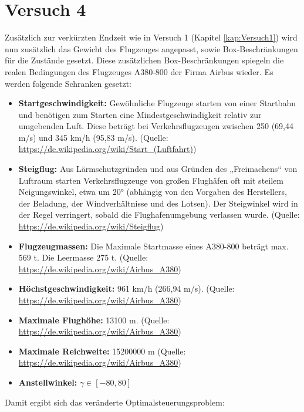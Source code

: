 \newpage
\section{Versuch 4}
Zusätzlich zur verkürzten Endzeit wie in Versuch 1 (Kapitel \ref{kap:Versuch1}) wird nun zusätzlich das Gewicht des Flugzeuges angepasst, sowie Box-Beschränkungen für die Zustände gesetzt. Diese zusätzlichen Box-Beschränkungen spiegeln die realen Bedingungen des Flugzeuges A380-800 der Firma Airbus wieder. Es werden folgende Schranken gesetzt:
\begin{itemize}
\item \textbf{Startgeschwindigkeit:} Gewöhnliche Flugzeuge starten von einer Startbahn und benötigen zum Starten eine Mindestgeschwindigkeit relativ zur umgebenden Luft. Diese beträgt bei Verkehrsflugzeugen zwischen 250 (69,44 m/s) und 345 km/h (95,83 m/s). (Quelle: \url{https://de.wikipedia.org/wiki/Start_(Luftfahrt)})
%
\item \textbf{Steigflug:} Aus Lärmschutzgründen und aus Gründen des „Freimachens“ von Luftraum starten Verkehrsflugzeuge von großen Flughäfen oft mit steilem Neigungswinkel, etwa um 20° (abhängig von den Vorgaben des Herstellers, der Beladung, der Windverhältnisse und des Lotsen). Der Steigwinkel wird in der Regel verringert, sobald die Flughafenumgebung verlassen wurde. (Quelle: \url{https://de.wikipedia.org/wiki/Steigflug})
%
\item \textbf{Flugzeugmassen:} Die Maximale Startmasse eines A380-800 beträgt max. 569 t. Die Leermasse 275 t. (Quelle: \url{https://de.wikipedia.org/wiki/Airbus_A380})
%
\item \textbf{Höchstgeschwindigkeit:} 961 km/h (266,94 m/s). (Quelle: \url{https://de.wikipedia.org/wiki/Airbus_A380})
%
\item \textbf{Maximale Flughöhe:} 13100 m. (Quelle: \url{https://de.wikipedia.org/wiki/Airbus_A380})
%
\item \textbf{Maximale Reichweite:} 15200000 m (Quelle: \url{https://de.wikipedia.org/wiki/Airbus_A380})
%
\item \textbf{Anstellwinkel:} $\gamma \in [-80,80]$
\end{itemize}
Damit ergibt sich das veränderte Optimalsteuerungsproblem:
